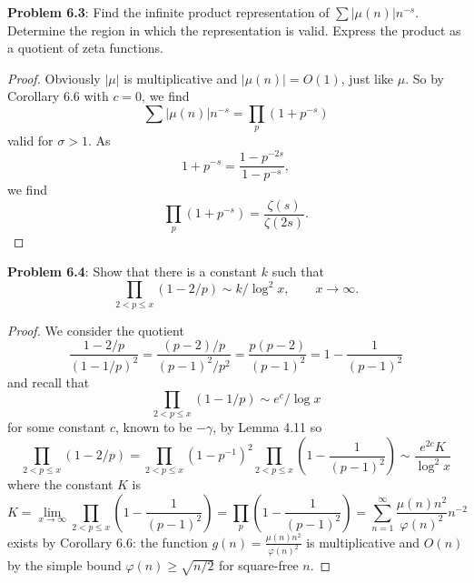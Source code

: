 \documentclass[12pt]{article}
\begin{document}
\fi

\textbf{Problem 6.3}: Find the infinite product representation of $\sum |\mu(n)| n^{-s}$. Determine the region in which the representation is valid. Express the product as a quotient of zeta functions.

\begin{proof}
Obviously $|\mu|$ is multiplicative and $|\mu(n)| = O(1)$, just like $\mu$. So by Corollary 6.6 with $c = 0$, we find
$$\sum |\mu(n)| n^{-s} = \prod_p (1 + p^{-s})$$
valid for $\sigma > 1$. As
$$1 + p^{-s} = \frac{1 - p^{-2s}}{1 - p^{-s}},$$
we find
$$\prod_p (1 + p^{-s}) = \frac{\zeta(s)}{\zeta(2s)}.$$
\end{proof}

\textbf{Problem 6.4}: Show that there is a constant $k$ such that
$$\prod_{2 < p \leq x} (1 - 2/p) \sim k/\log^2 x, \qquad x \rightarrow \infty.$$

\begin{proof}
We consider the quotient
$$\frac{1 - 2/p}{(1 - 1/p)^2} = \frac{(p-2)/p}{(p-1)^2/p^2} = \frac{p(p-2)}{(p-1)^2} = 1 - \frac{1}{(p-1)^2}$$
and recall that
$$\prod_{2 < p \leq x} (1 - 1/p) \sim e^c / \log x$$
for some constant $c$, known to be $-\gamma$, by Lemma 4.11 so
$$\prod_{2 < p \leq x} (1 - 2/p) = \prod_{2 < p \leq x} (1 - p^{-1})^2 \prod_{2 < p \leq x} \left( 1 - \frac{1}{(p-1)^2} \right) \sim \frac{e^{2c} K}{\log^2 x}$$
where the constant $K$ is
$$K = \lim_{x \rightarrow \infty} \prod_{2 < p \leq x} \left( 1 - \frac{1}{(p-1)^2} \right) = \prod_p \left( 1 - \frac{1}{(p-1)^2} \right) = \sum_{n=1}^{\infty} \frac{\mu(n) n^2}{\varphi(n)^2} n^{-2}$$
exists by Corollary 6.6: the function $g(n) = \frac{\mu(n) n^2}{\varphi(n)^2}$ is multiplicative and $O(n)$ by the simple bound $\varphi(n) \geq \sqrt{n / 2}$ for square-free $n$.
\end{proof}

\unless\ifdefined\IsMainDocument
\end{document}
